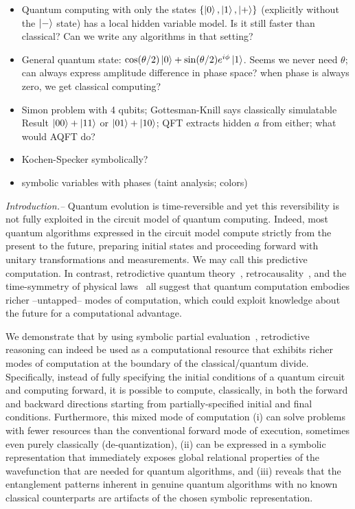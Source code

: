 \documentclass[aps,prl,twocolumn,superscriptaddress,floatfix,notitlepage]{revtex4-2}
\begin{document}
\begin{itemize}
\item Quantum computing with only the states $\{\ket{0}, \ket{1}, \ket{+}\}$  (explicitly without the $\ket{-}$ state) has a local hidden variable model. Is it still faster than classical? Can we write any algorithms in that setting?
\item General quantum state: $\cos(\theta/2) \ket{0} + \sin(\theta/2) e^{i\phi} \ket{1}$. Seems we never need $\theta$; can always express amplitude difference in phase space? when phase is always zero, we get classical computing?
  \item Simon problem with 4 qubits; Gottesman-Knill says classically
    simulatable Result $\ket{00}+\ket{11}$ or $\ket{01}+\ket{10}$; QFT
    extracts hidden $a$ from either; what would AQFT do?
    \item Kochen-Specker symbolically?
    \item symbolic variables with phases (taint analysis; colors)
\end{itemize}

{\it Introduction.--} Quantum evolution is time-reversible and yet this reversibility 
is not fully exploited in the circuit model of quantum
computing. Indeed, most quantum algorithms expressed in the circuit
model compute strictly from the present to the future, preparing
initial states and proceeding forward with unitary transformations and
measurements. We may call this predictive computation. In contrast, retrodictive quantum
theory~\cite{sym13040586}, retrocausality~\cite{Aharonov2008}, and the
time-symmetry of physical laws~\cite{RevModPhys.27.179} all suggest
that quantum computation embodies richer --untapped-- modes of
computation, which could exploit knowledge about the future for a
computational advantage.

We demonstrate that by using symbolic partial
evaluation~\cite{futamura}, retrodictive reasoning can indeed be used
as a computational resource that exhibits richer modes of computation
at the boundary of the classical/quantum divide. Specifically, instead
of fully specifying the initial conditions of a quantum circuit and
computing forward, it is possible to compute, classically, in both the
forward and backward directions starting from partially-specified
initial and final conditions. Furthermore, this mixed mode of
computation (i) can solve problems with fewer resources than the
conventional forward mode of execution, sometimes even purely
classically (de-quantization), (ii) can be expressed in a symbolic
representation that immediately exposes global relational properties
of the wavefunction that are needed for quantum algorithms, and (iii)
reveals that the entanglement patterns inherent in genuine quantum
algorithms with no known classical counterparts are artifacts of the
chosen symbolic representation.
\end{document}

